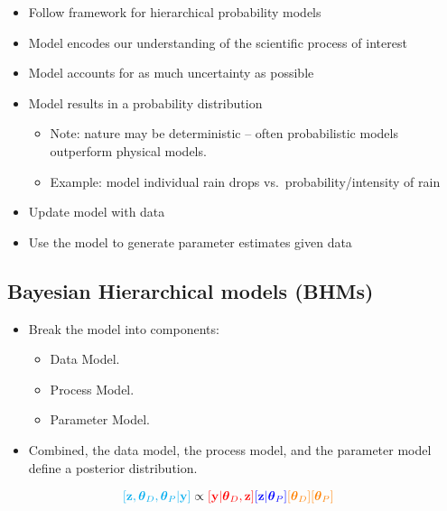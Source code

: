 \documentclass[]{book}
\providecommand{\tightlist}{%
  \setlength{\itemsep}{0pt}\setlength{\parskip}{0pt}}
\begin{document}
\begin{itemize}
\item
  Follow \citet{berliner1996hierarchical} framework for hierarchical probability models
\item
  Model encodes our understanding of the scientific process of interest
\item
  Model accounts for as much uncertainty as possible
\item
  Model results in a probability distribution

  \begin{itemize}
  \tightlist
  \item
    Note: nature may be deterministic -- often probabilistic models outperform physical models.
  \item
    Example: model individual rain drops vs.~probability/intensity of rain
  \end{itemize}
\item
  Update model with data
\item
  Use the model to generate parameter estimates given data
\end{itemize}

\hypertarget{bayesian-hierarchical-models-bhms}{%
\subsection{Bayesian Hierarchical models (BHMs)}\label{bayesian-hierarchical-models-bhms}}

\begin{itemize}
\item
  Break the model into components:

  \begin{itemize}
  \item
    { Data Model. }
  \item
    { Process Model. }
  \item
    { Parameter Model. }
  \end{itemize}
\item
  Combined, the { data model, } the { process model, } and the { parameter model } define a { posterior distribution. }
\end{itemize}

\begin{align*}
\color{cyan}{[\mathbf{z}, \boldsymbol{\theta}_D, \boldsymbol{\theta}_P | \mathbf{y}]} & \propto
\color{red}{[\mathbf{y} | \boldsymbol{\theta}_D, \mathbf{z}]}  \color{blue}{[\mathbf{z} | \boldsymbol{\theta}_P]} \color{orange}{[\boldsymbol{\theta}_D] [\boldsymbol{\theta}_P]}
\end{align*}
\end{document}
